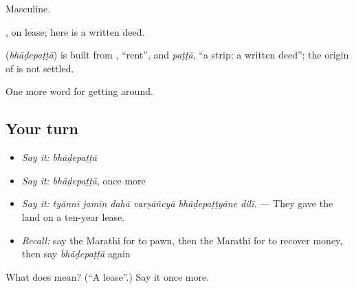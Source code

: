 Masculine.

, on lease;  here is a written deed.

\begin{cousinweb}
\textbf{} (\emph{bhāḍepaṭṭā}) is built from \textbf{}, \textquotedblleft{}rent\textquotedblright{}, and \emph{paṭṭā}, \textquotedblleft{}a strip; a written deed\textquotedblright{}; the origin of  is not settled.
\end{cousinweb}

\begin{grammarlens}[title={What you've built}]
One more word for getting around.
\end{grammarlens}

\subsection*{Your turn}
\begin{itemize}
\raggedright
  \item \emph{Say it:} \emph{bhāḍepaṭṭā}
  \item \emph{Say it:} \emph{bhāḍepaṭṭā}, once more
  \item \emph{Say it:} \emph{tyānnī jamīn dahā varṣāñcyā bhāḍepaṭṭyāne dilī.} — They gave the land on a ten-year lease.
  \item \emph{Recall:} say the Marathi for to pawn, then the Marathi for to recover money, then say \emph{bhāḍepaṭṭā} again
\end{itemize}

\begin{tcolorbox}[breakable,colback=teal!4,colframe=teal!35!black,title={Before you move on}]
What does  mean? (\textquotedblleft{}A lease\textquotedblright{}.) Say it once more.
\end{tcolorbox}
